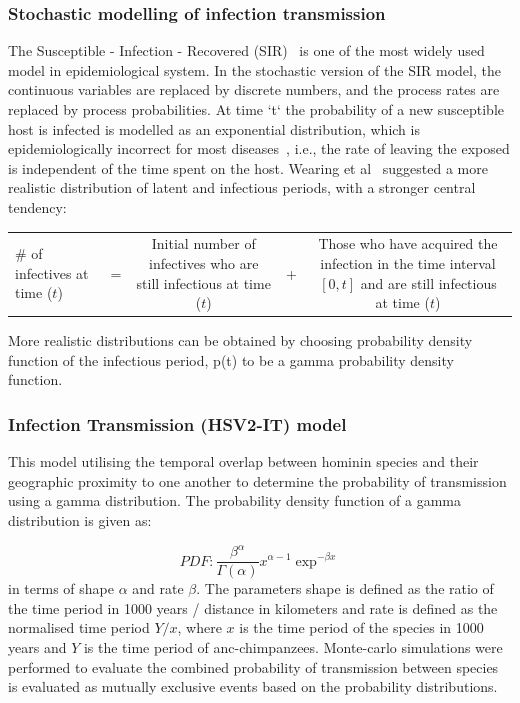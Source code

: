 \documentclass[fleqn,10pt]{wlscirep}
\begin{document}
\subsubsection*{Stochastic modelling of infection transmission}
The Susceptible - Infection - Recovered (SIR)~\cite{callahanspread} is one of the most widely used model in epidemiological system. In the stochastic version of the SIR model, the continuous variables are replaced by discrete numbers, and the process rates are replaced by process probabilities. At time `t` the probability of a new susceptible host is infected is modelled as an exponential distribution, which is epidemiologically incorrect for most diseases~\cite{Wearing2005,Bailey1975,sartwell1950distribution}, i.e., the rate of leaving the exposed is independent of the time spent on the host. Wearing et al~\cite{Wearing2005} suggested a more realistic distribution of latent and infectious periods, with a stronger central tendency:

\begin{table}
	\centering
	\renewcommand{\arraystretch}{1.5}
	\begin{tabulary}{\linewidth}{LCCCC}
		\# of infectives at time ($t$) & =  & 
		Initial number of infectives who are still infectious at time ($t$) & + & 
 Those who have acquired the infection in the time interval $[0, t]$ and are still infectious at time ($t$)			\\ 
\end{tabulary}
\end{table}

More realistic distributions can be obtained by choosing  probability density function of the infectious period,  p(t) to be a gamma probability density function\cite{Blythe1988,Lloyd2001}.

\subsubsection*{Infection Transmission (HSV2-IT) model}
This model utilising the temporal overlap between hominin species and their geographic proximity to one another to determine the probability of transmission using a gamma distribution. The probability density function of a gamma distribution is given as:

\begin{equation}
PDF:\frac{\beta^\alpha}{\Gamma(\alpha)}x^{\alpha - 1} \exp^{-\beta x}
\end{equation}
in terms of shape $\alpha$ and rate $\beta$. The parameters shape is defined as the ratio of the time period in 1000 years / distance in kilometers and  rate  is defined as the normalised time period $Y / x$, where $x$ is the time period of the species in 1000 years and $Y$ is the time period of anc-chimpanzees. Monte-carlo simulations were performed to evaluate the combined probability of transmission between species is evaluated as mutually exclusive events based on the probability distributions. 
\end{document}
